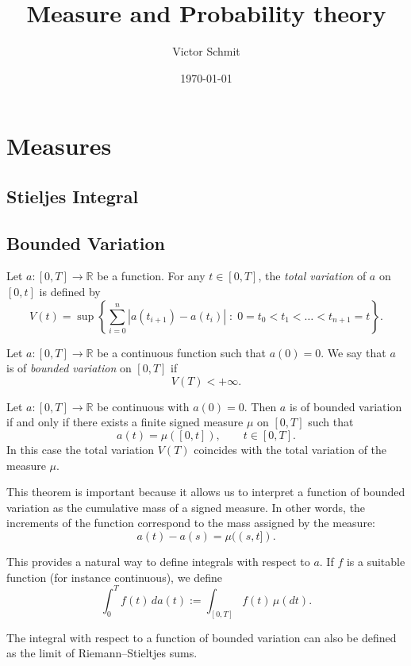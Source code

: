 \documentclass[10pt]{report}
\title{Measure and Probability theory}
\author{Victor Schmit}
\date{\today}
\newcommand{\R}{\mathbb{R}}
\begin{document}
\maketitle

\tableofcontents
\newpage

\chapter{Measures}



\section{Stieljes Integral}
\label{sec:stieljes}

\section{Bounded Variation}

Let $a : [0, T] \to \R$ be a function. For any $t \in [0,T]$, the \emph{total variation}
of $a$ on $[0,t]$ is defined by
\[
	V(t) =
	\sup \left\{
	\sum_{i=0}^{n}
	|a(t_{i+1}) - a(t_i)|
	\; : \;
	0 = t_0 < t_1 < \dots < t_{n+1} = t
	\right\}.
\]

Let $a : [0, T] \to \R$ be a continuous function such that $a(0)=0$.
We say that $a$ is of \emph{bounded variation} on $[0,T]$ if
\[
	V(T) < +\infty .
\]

\thm
\label{thm:bound-stiel}
Let $a : [0,T] \to \R$ be continuous with $a(0)=0$.
Then $a$ is of bounded variation if and only if there exists a finite signed
measure $\mu$ on $[0,T]$ such that
\[
	a(t) = \mu([0,t]), \qquad t \in [0,T].
\]
In this case the total variation $V(T)$ coincides with the total variation of the
measure $\mu$.

\rem
This theorem is important because it allows us to interpret a function of bounded
variation as the cumulative mass of a signed measure. In other words, the
increments of the function correspond to the mass assigned by the measure:
\[
	a(t) - a(s) = \mu((s,t]).
\]

This provides a natural way to define integrals with respect to $a$.
If $f$ is a suitable function (for instance continuous), we define
\[
	\int_0^T f(t)\, da(t)
	:= \int_{[0,T]} f(t)\, \mu(dt).
\]

\rem
The integral with respect to a function of bounded variation can also be
defined as the limit of Riemann--Stieltjes sums.
\end{document}
